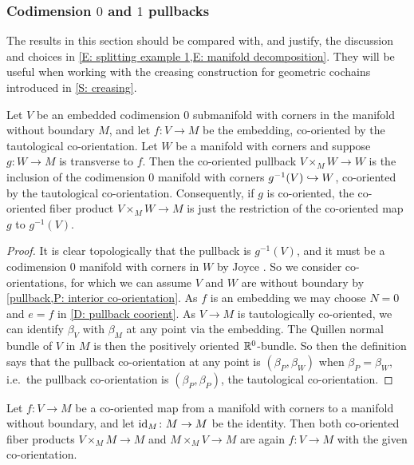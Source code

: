 \subsubsection{Codimension $0$ and $1$ pullbacks}\label{S: codim 0 and 1 co-or}

The results in this section should be compared with, and justify, the discussion and choices in \cref{E: splitting example 1,E: manifold decomposition}.
They will be useful when working with the creasing construction for geometric cochains introduced in \cref{S: creasing}.

\begin{proposition}\label{P: codim 0 pullback}
	Let $V$ be an embedded codimension $0$ submanifold with corners in the manifold without boundary $M$, and let $f \colon V \to M$ be the embedding, co-oriented by the tautological co-orientation.
	Let $W$ be a manifold with corners and suppose $g \colon W \to M$ is transverse to $f$.
	Then the co-oriented pullback $V \times_M W \to W$ is the inclusion of the codimension $0$ manifold with corners $g^{-1}(V) \hookrightarrow W$, co-oriented by the tautological co-orientation.
	Consequently, if $g$ is co-oriented, the co-oriented fiber product $V \times_M W \to M$ is just the restriction of the co-oriented map $g$ to $g^{-1}(V)$.
\end{proposition}

\begin{proof}
	It is clear topologically that the pullback is $g^{-1}(V)$, and it must be a codimension $0$ manifold with corners in $W$ by Joyce \cite[Theorem 6.4]{Joy12}.
	So we consider co-orientations, for which we can assume $V$ and $W$ are without boundary by \cref{pullback,P: interior co-orientation}.
	As $f$ is an embedding we may choose $N = 0$ and $e = f$ in \cref{D: pullback coorient}.
	As $V \to M$ is tautologically co-oriented, we can identify $\beta_V$ with $\beta_M$ at any point via the embedding.
	The Quillen normal bundle of $V$ in $M$ is then the positively oriented $\mathbb{R}^0$-bundle.
	So then the definition says that the pullback co-orientation at any point is $(\beta_P, \beta_W)$ when $\beta_P = \beta_W$, i.e.\ the pullback co-orientation is $(\beta_P, \beta_P)$, the tautological co-orientation.
\end{proof}

\begin{corollary}\label{C: cup with identity}
	Let $f \colon V \to M$ be a co-oriented map from a manifold with corners to a manifold without boundary, and let $\mathrm{id}_M \colon M \to M$ be the identity.
	Then both co-oriented fiber products $V \times_M M \to M$ and $M \times_M V \to M$ are again $f \colon V \to M$ with the given co-orientation.
\end{corollary}

